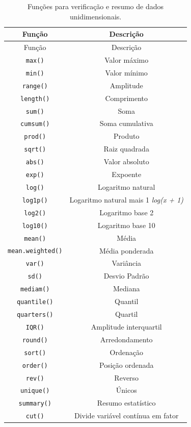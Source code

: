 \documentclass[
]{article}
\begin{document}
\begin{longtable}[]{@{}cc@{}}
\caption{\label{tab:tab-tab-funcoes-conf-uni}Funções para verificação e resumo de dados unidimensionais.}\tabularnewline
\toprule\noalign{}
Função & Descrição \\
\midrule\noalign{}
\endfirsthead
\toprule\noalign{}
Função & Descrição \\
\midrule\noalign{}
\endhead
\bottomrule\noalign{}
\endlastfoot
\texttt{max()} & Valor máximo \\
\texttt{min()} & Valor mínimo \\
\texttt{range()} & Amplitude \\
\texttt{length()} & Comprimento \\
\texttt{sum()} & Soma \\
\texttt{cumsum()} & Soma cumulativa \\
\texttt{prod()} & Produto \\
\texttt{sqrt()} & Raiz quadrada \\
\texttt{abs()} & Valor absoluto \\
\texttt{exp()} & Expoente \\
\texttt{log()} & Logaritmo natural \\
\texttt{log1p()} & Logaritmo natural mais 1 \emph{log(x + 1)} \\
\texttt{log2()} & Logaritmo base 2 \\
\texttt{log10()} & Logaritmo base 10 \\
\texttt{mean()} & Média \\
\texttt{mean.weighted()} & Média ponderada \\
\texttt{var()} & Variância \\
\texttt{sd()} & Desvio Padrão \\
\texttt{mediam()} & Mediana \\
\texttt{quantile()} & Quantil \\
\texttt{quarters()} & Quartil \\
\texttt{IQR()} & Amplitude interquartil \\
\texttt{round()} & Arredondamento \\
\texttt{sort()} & Ordenação \\
\texttt{order()} & Posição ordenada \\
\texttt{rev()} & Reverso \\
\texttt{unique()} & Únicos \\
\texttt{summary()} & Resumo estatístico \\
\texttt{cut()} & Divide variável contínua em fator \\

\end{longtable}
\end{document}
